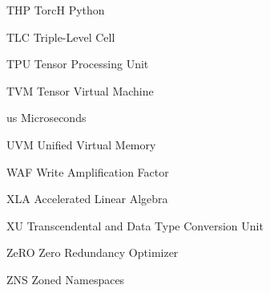 \begin{symbollist*}
\item[THP] TorcH Python
\item[TLC] Triple-Level Cell
\item[TPU] Tensor Processing Unit
\item[TVM] Tensor Virtual Machine
\item[us] Microseconds
\item[UVM] Unified Virtual Memory
\item[WAF] Write Amplification Factor
\item[XLA] Accelerated Linear Algebra
\item[XU] Transcendental and Data Type Conversion Unit
\item[ZeRO] Zero Redundancy Optimizer
\item[ZNS] Zoned Namespaces
\end{symbollist*}
